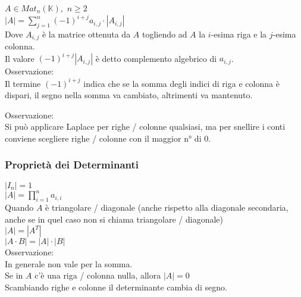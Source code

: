 \documentclass[a4paper, twoside, italian, 11pt]{book}
\newcommand{\K}{\mathbb{K}}
\begin{document}
$A \in Mat_n(\K),$ $n \geq 2$ \\

\noindent
$\left | A \right | = \sum_{j=1}^{n} (-1)^{i+j} a_{i,j} \cdot \left | A_{i,j} \right |$ \\

\noindent
Dove $A_{i,j}$ è la matrice ottenuta da $A$ togliendo ad $A$ la $i$-esima riga e la $j$-esima colonna. \\

\noindent
Il valore $(-1)^{i+j} \left | A_{i,j} \right |$ è detto complemento algebrico di $a_{i,j}$. \\

\noindent
Osservazione: \\
Il termine $(-1)^{i+j}$ indica che se la somma degli indici di riga e colonna è dispari, il segno nella somma va cambiato, altrimenti va mantenuto.

\noindent
Osservazione: \\
Si può applicare Laplace per righe / colonne qualsiasi, ma per snellire i conti conviene scegliere righe / colonne con il maggior n° di $0$.


\subsubsection{Proprietà dei Determinanti}

$\left | I_n \right | = 1$ \\

\noindent
$\left | A \right | = \prod_{i=1}^n a_{i,i}$ \\

\noindent
Quando $A$ è triangolare / diagonale (anche rispetto alla diagonale secondaria, anche se in quel caso non si chiama triangolare / diagonale) \\

\noindent
$\left | A \right | = \left | A^T \right |$ \\

\noindent
$\left | A \cdot B \right | = \left | A \right | \cdot \left | B \right |$ \\

\noindent
Osservazione: \\
In generale non vale per la somma. \\

\noindent
Se in $A$ c'è una riga / colonna nulla, allora $\left | A \right | = 0$ \\

\noindent
Scambiando righe e colonne %
il determinante cambia di segno. \\
\end{document}
